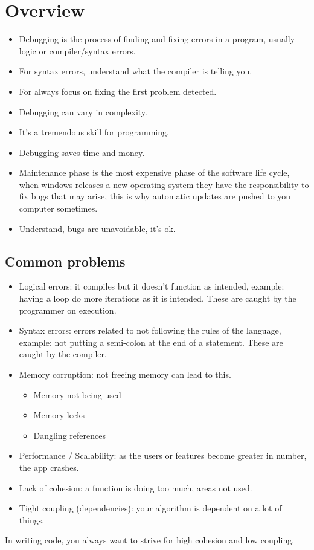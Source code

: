 \section{Overview}
\begin{itemize}
    \item Debugging is the process of finding and fixing errors in a program, usually logic or compiler/syntax errors.
    \item For syntax errors, understand what the compiler is telling you. 
    \item For always focus on fixing the first problem detected. 
    \item Debugging can vary in complexity. 
    \item It's a tremendous skill for programming. 
    \item Debugging saves time and money.
    \item Maintenance phase is the most expensive phase of the software life cycle, when windows releases a new operating system they have the responsibility to fix bugs that may arise, this is why automatic updates are pushed to you computer sometimes. 
    \item Understand, bugs are unavoidable, it's ok. 
\end{itemize}
\subsection{Common problems}
\begin{itemize}
    \item Logical errors: it compiles but it doesn't function as intended, example: having a loop do more iterations as it is intended. These are caught by the programmer on execution.
    \item Syntax errors: errors related to not following the rules of the language, example: not putting a semi-colon at the end of a statement. These are caught by the compiler.
    \item Memory corruption: not freeing memory can lead to this. 
        \begin{itemize}
            \item Memory not being used 
            \item Memory leeks 
            \item Dangling references
        \end{itemize}
    
    \item Performance / Scalability: as the users or features become greater in number, the app crashes. 
    \item Lack of cohesion: a function is doing too much, areas not used. 
    \item Tight coupling (dependencies): your algorithm is dependent on a lot of things. 
\end{itemize}
In writing code, you always want to strive for high cohesion and low coupling. 

